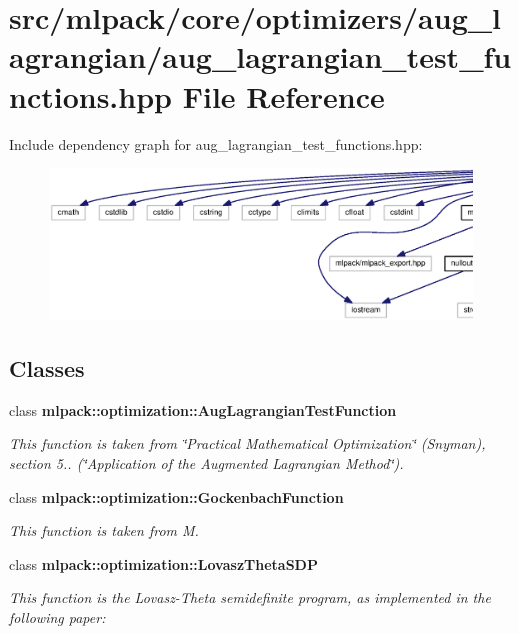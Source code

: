 \section{src/mlpack/core/optimizers/aug\+\_\+lagrangian/aug\+\_\+lagrangian\+\_\+test\+\_\+functions.hpp File Reference}
\label{aug__lagrangian__test__functions_8hpp}
Include dependency graph for aug\+\_\+lagrangian\+\_\+test\+\_\+functions.\+hpp\+:
\nopagebreak
\begin{figure}[H]
\begin{center}
\leavevmode
\includegraphics[width=350pt]{aug__lagrangian__test__functions_8hpp__incl}
\end{center}
\end{figure}
\subsection*{Classes}
\begin{DoxyCompactItemize}
\item 
class {\bf mlpack\+::optimization\+::\+Aug\+Lagrangian\+Test\+Function}
\begin{DoxyCompactList}\small\item\em This function is taken from \char`\"{}\+Practical Mathematical Optimization\char`\"{} (Snyman), section 5.. (\char`\"{}\+Application of the Augmented Lagrangian Method\char`\"{}). \end{DoxyCompactList}\item 
class {\bf mlpack\+::optimization\+::\+Gockenbach\+Function}
\begin{DoxyCompactList}\small\item\em This function is taken from M. \end{DoxyCompactList}\item 
class {\bf mlpack\+::optimization\+::\+Lovasz\+Theta\+S\+DP}
\begin{DoxyCompactList}\small\item\em This function is the Lovasz-\/\+Theta semidefinite program, as implemented in the following paper\+: \end{DoxyCompactList}\end{DoxyCompactItemize}
